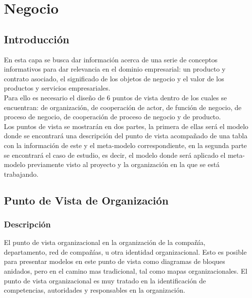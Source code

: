 \chapter{Negocio}

\section{Introducción}
En esta capa se busca dar información acerca de una serie  de conceptos informativos para dar relevancia  en el dominio empresarial: un producto y contrato asociado, el significado de los objetos de negocio y el valor de los productos y servicios empresariales.\\
Para ello es necesario el diseño de 6 puntos de vista dentro de los cuales se encuentran: de organización, de cooperación de actor, de función de negocio, de proceso de negocio, de cooperación de proceso de negocio y de producto.\\
Los puntos de vista se mostrarán en dos partes, la primera de ellas será el modelo donde se encontrará una descripción del punto de vista acompañado de una tabla con la información de este y el meta-modelo correspondiente, en la segunda parte se encontrará el caso de estudio, es decir, el modelo donde será aplicado el meta-modelo previamente visto al proyecto y la organización en la que se está trabajando.
\newpage

\section{Punto de Vista de Organización}
\subsection{Descripción}
El punto de vista organizacional en la organización de la compañía, departamento, red de compañías, u otra identidad organizacional. Esto es posible para presentar modelos en este punto de vista como diagramas de bloques anidados, pero en el camino mas tradicional, tal como mapas organizacionales. El punto de vista organizacional es muy tratado en 	la identificación de competencias, autoridades y responsables en la organización.

